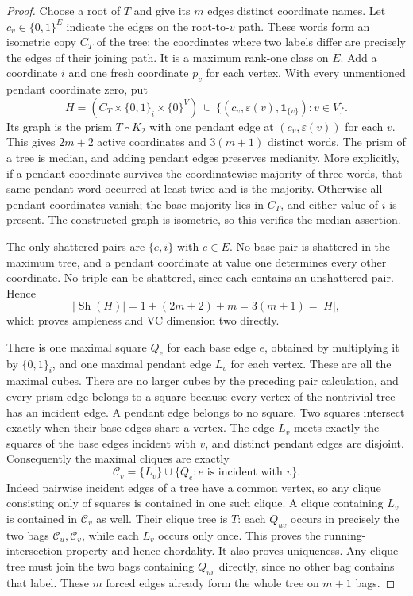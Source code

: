 \begin{proof}
Choose a root of $T$ and give its $m$ edges distinct coordinate names.
Let $c_v\in\{0,1\}^E$ indicate the edges on the root-to-$v$ path.
These words form an isometric copy $C_T$ of the tree: the coordinates
where two labels differ are precisely the edges of their joining path.
It is a maximum rank-one class on $E$.
Add a coordinate $i$ and one fresh coordinate $p_v$ for each vertex.
With every unmentioned pendant coordinate zero, put
\[
 H=(C_T\times\{0,1\}_i\times\{0\}^{V})
     \ \cup\ \{(c_v,\varepsilon(v),\mathbf1_{\{v\}}):v\in V\}.
\]
Its graph is the prism $T\mathbin\square K_2$ with one pendant edge
at $(c_v,\varepsilon(v))$ for each $v$. This gives $2m+2$ active
coordinates and $3(m+1)$ distinct words. The prism of a tree is median,
and adding pendant edges preserves medianity. More explicitly, if a
pendant coordinate survives the coordinatewise majority of three words,
that same pendant word occurred at least twice and is the majority.
Otherwise all pendant coordinates vanish; the base majority lies in
$C_T$, and either value of $i$ is present. The constructed graph is
isometric, so this verifies the median assertion.

The only shattered pairs are $\{e,i\}$ with $e\in E$. No base pair
is shattered in the maximum tree, and a pendant coordinate at value
one determines every other coordinate. No triple can be shattered,
since each contains an unshattered pair. Hence
\[
 |\operatorname{Sh}(H)|=1+(2m+2)+m=3(m+1)=|H|,
\]
which proves ampleness and VC dimension two directly.

There is one maximal square $Q_e$ for each base edge $e$, obtained by
multiplying it by $\{0,1\}_i$, and one maximal pendant edge $L_v$ for
each vertex. These are all the maximal cubes. There are no larger
cubes by the preceding pair calculation, and every prism edge belongs
to a square because every vertex of the nontrivial tree has an incident
edge. A pendant edge belongs to no square.
Two squares intersect exactly when their base edges share a vertex.
The edge $L_v$ meets exactly the squares of the base edges incident
with $v$, and distinct pendant edges are disjoint. Consequently the
maximal cliques are exactly
\[
 \mathcal C_v=\{L_v\}\cup\{Q_e:e\text{ is incident with }v\}.
\]
Indeed pairwise incident edges of a tree have a common vertex, so any
clique consisting only of squares is contained in one such clique.
A clique containing $L_v$ is contained in $\mathcal C_v$ as well.
Their clique tree is $T$: each $Q_{uv}$ occurs in precisely the two
bags $\mathcal C_u,\mathcal C_v$, while each $L_v$ occurs only once.
This proves the running-intersection property and hence chordality.
It also proves uniqueness. Any clique tree must join the two bags
containing $Q_{uv}$ directly, since no other bag contains that label.
These $m$ forced edges already form the whole tree on $m+1$ bags.


\end{proof}
